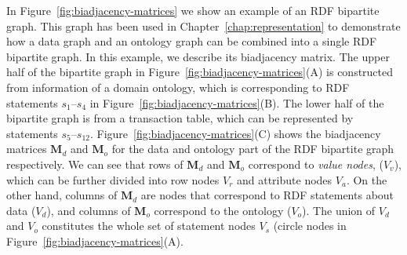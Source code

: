 \begin{myexp}
\label{ex:bi-adj}
In Figure~\ref{fig:biadjacency-matrices} we show an example of an RDF bipartite graph. This graph has been used in Chapter~\ref{chap:representation} to demonstrate how a data graph and an ontology graph can be combined into a single RDF bipartite graph. In this example, we describe its biadjacency matrix. The upper half of the bipartite graph in Figure~\ref{fig:biadjacency-matrices}(A) is constructed from information of a domain ontology, which is corresponding to RDF statements $s_1$--$s_4$ in Figure~\ref{fig:biadjacency-matrices}(B). The lower half of the bipartite graph is from a transaction table, which can be represented by statements $s_5$--$s_{12}$. Figure~\ref{fig:biadjacency-matrices}(C) shows the biadjacency matrices $\mathbf{M}_d$ and $\mathbf{M}_o$ for the data and ontology part of the RDF bipartite graph respectively. We can see that rows of $\mathbf{M}_d$ and $\mathbf{M}_o$ correspond to \emph{value nodes}, ($V_v$), which can be further divided into row nodes $V_r$ and attribute nodes $V_a$. On the other hand, columns of $\mathbf{M}_d$ are nodes that correspond to RDF statements about data ($V_d$), and columns of $\mathbf{M}_o$ correspond to the ontology ($V_o$). The union of $V_d$ and $V_o$ constitutes the whole set of statement nodes $V_s$ (circle nodes in Figure~\ref{fig:biadjacency-matrices}(A).
\end{myexp}


